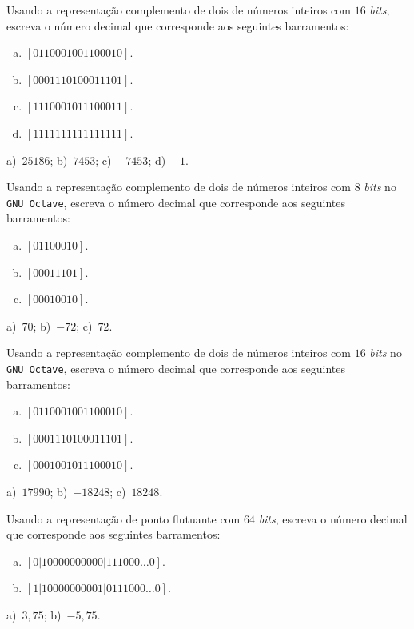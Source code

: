 \begin{exer}
  Usando a representação complemento de dois de números inteiros com $16$ \emph{bits}, escreva o número decimal que corresponde aos seguintes barramentos:
  \begin{enumerate}[a)]
  \item $[0110001001100010]$.
  \item $[0001110100011101]$.
  \item $[1110001011100011]$.
  \item $[1111111111111111]$.
   \end{enumerate}
\end{exer}
\begin{resp}
  a)~$25186$; b)~$7453$; c)~$-7453$; d)~$-1$.
\end{resp}


\begin{exer}
  Usando a representação complemento de dois de números inteiros com $8$ \emph{bits} no \verb+GNU Octave+, escreva o número decimal que corresponde aos seguintes barramentos:
  \begin{enumerate}[a)]
  \item $[01100010]$.
  \item $[00011101]$.
  \item $[00010010]$.
  \end{enumerate}
\end{exer}
\begin{resp}
  a)~$70$; b)~$-72$; c)~$72$.
\end{resp}

\begin{exer}
  Usando a representação complemento de dois de números inteiros com $16$ \emph{bits} no \verb+GNU Octave+, escreva o número decimal que corresponde aos seguintes barramentos:
  \begin{enumerate}[a)]
  \item $[0110001001100010]$.
  \item $[0001110100011101]$.
  \item $[0001001011100010]$.
  \end{enumerate}
\end{exer}
\begin{resp}
  a)~$17990$; b)~$-18248$; c)~$18248$.
\end{resp}


\begin{exer}
  Usando a representação de ponto flutuante com $64$ \emph{bits}, escreva o número decimal que corresponde aos seguintes barramentos:
  \begin{enumerate}[a)]
  \item $[0|10000000000|111000\ldots 0]$.
  \item $[1|10000000001|0111000\ldots 0]$.
  \end{enumerate}
\end{exer}
\begin{resp}
  a)~$3,75$; b)~$-5,75$.
\end{resp}

